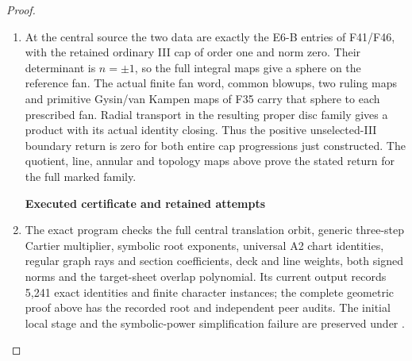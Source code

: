 \begin{proof}
\begin{enumerate}[label=\arabic*.]
\item At the central source the two data are exactly the E6-B
entries of F41/F46, with the retained ordinary III cap of
order one and norm zero. Their determinant is \(n=\pm1\),
so the full integral maps give a sphere on the reference fan.
The actual finite fan word, common blowups, two ruling maps
and primitive Gysin/van Kampen maps of F35 carry that sphere
to each prescribed fan. Radial transport in the resulting
proper disc family gives a product with its actual identity
closing. Thus the positive unselected-III boundary return is
zero for both entire cap progressions just constructed.
The quotient, line, annular and topology maps above prove the stated return for the full marked family.

\par

\medskip\noindent\textbf{Executed certificate and retained attempts}

\par\nobreak

\item The exact program 
checks the full central translation orbit, generic three-step
Cartier multiplier, symbolic root exponents, universal A2 chart
identities, regular graph rays and section coefficients, deck and
line weights, both signed norms and the target-sheet overlap
polynomial. Its current output records 5,241 exact identities
and finite character instances; the complete geometric proof above has the recorded root and independent peer audits.
The initial local stage and the symbolic-power simplification
failure are preserved under
.

\end{enumerate}
\end{proof}